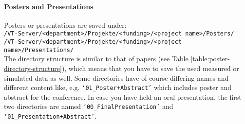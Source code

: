 \paragraph{Posters and Presentations}

\begin{table}[!h]
  \caption{%
  The data of every poster has to be saved in seven subdirectories;
  further remarks: \\
  **When the poster was presented, the corresponding presenter loads the last
  and revised version (i.e. only the real used but absolutely complete data)
  into the protected directory \\
  ***If the data reproduced in a figure/table is from distributed raw data
  directories, it is sufficient to save here only the generating program%
  }

\label{table:poster-directory-structure}
\end{table}

\noindent Posters or presentations are saved under: \\
\texttt{/VT-Server/<department>/Projekte/<funding>/<project name>/Posters/} \\
\texttt{/VT-Server/<department>/Projekte/<funding>/<project name>/Presentations/} \\
The directory structure is similar to that of papers (see Table \ref{table:poster-directory-structure}), which means that you have
to save the used measured or simulated data as well. Some directories have of
course differing names and different content like, e.g.
\texttt{‘01\_Poster+Abstract’} which includes poster and abstract for the
conference. In case you have held an oral presentation, the first two
directories are named \texttt{‘00\_FinalPresentation’} and
\texttt{‘01\_Presentation+Abstract’}.
